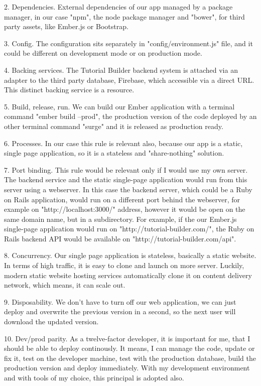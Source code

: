 \documentclass[12pt, a4paper, oneside, openright, medskipamount]{report}
\begin{document}
2. Dependencies. External dependencies of our app managed by a package manager, in our case "npm", the node package manager and "bower", for third party assets, like Ember.js or Bootstrap.

3. Config. The configuration sits separately in "config/environment.js" file, and it could be different on development mode or on production mode.

4. Backing services. The Tutorial Builder backend system is attached via an adapter to the third party database, Firebase, which accessible via a direct URL. This distinct backing service is a resource.

5. Build, release, run. We can build our Ember application with a terminal command "ember build --prod", the production version of the code deployed by an other terminal command "surge" and it is released as production ready.

6. Processes. In our case this rule is relevant also, because our app is a static, single page application, so it is a stateless and "share-nothing" solution.

7. Port binding. This rule would be relevant only if I would use my own server. The backend service and the static single-page application would run from this server using a webserver. In this case the backend server, which could be a Ruby on Rails application, would run on a different port behind the webserver, for example on "http://localhost:3000/" address, however it would be open on the same domain name, but in a subdirectory. For example, if the our Ember.js single-page application would run on "http://tutorial-builder.com/", the Ruby on Rails backend API would be available on "http://tutorial-builder.com/api".

8. Concurrency. Our single page application is stateless, basically a static website. In terms of high traffic, it is easy to clone and launch on more server. Luckily, modern static website hosting services automatically clone it on content delivery network, which means, it can scale out.

9. Disposability. We don't have to turn off our web application, we can just deploy and overwrite the previous version in a second, so the next user will download the updated version.

10. Dev/prod parity. As a twelve-factor developer, it is important for me, that I should be able to deploy continously. It means, I can manage the code, update or fix it, test on the developer machine, test with the production database, build the production version and deploy immediately. With my development environment and with tools of my choice, this principal is adopted also.
\end{document}
